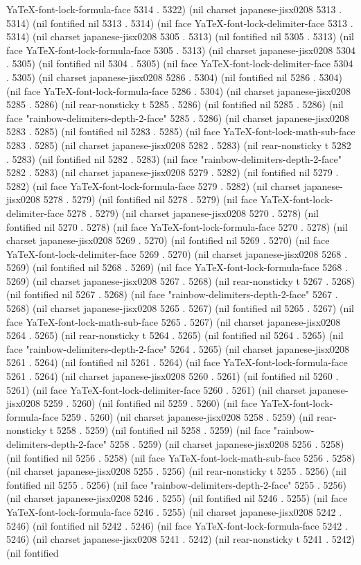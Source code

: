 YaTeX-font-lock-formula-face 5314 . 5322) (nil charset japanese-jisx0208 5313 . 5314) (nil fontified nil 5313 . 5314) (nil face YaTeX-font-lock-delimiter-face 5313 . 5314) (nil charset japanese-jisx0208 5305 . 5313) (nil fontified nil 5305 . 5313) (nil face YaTeX-font-lock-formula-face 5305 . 5313) (nil charset japanese-jisx0208 5304 . 5305) (nil fontified nil 5304 . 5305) (nil face YaTeX-font-lock-delimiter-face 5304 . 5305) (nil charset japanese-jisx0208 5286 . 5304) (nil fontified nil 5286 . 5304) (nil face YaTeX-font-lock-formula-face 5286 . 5304) (nil charset japanese-jisx0208 5285 . 5286) (nil rear-nonsticky t 5285 . 5286) (nil fontified nil 5285 . 5286) (nil face "rainbow-delimiters-depth-2-face" 5285 . 5286) (nil charset japanese-jisx0208 5283 . 5285) (nil fontified nil 5283 . 5285) (nil face YaTeX-font-lock-math-sub-face 5283 . 5285) (nil charset japanese-jisx0208 5282 . 5283) (nil rear-nonsticky t 5282 . 5283) (nil fontified nil 5282 . 5283) (nil face "rainbow-delimiters-depth-2-face" 5282 . 5283) (nil charset japanese-jisx0208 5279 . 5282) (nil fontified nil 5279 . 5282) (nil face YaTeX-font-lock-formula-face 5279 . 5282) (nil charset japanese-jisx0208 5278 . 5279) (nil fontified nil 5278 . 5279) (nil face YaTeX-font-lock-delimiter-face 5278 . 5279) (nil charset japanese-jisx0208 5270 . 5278) (nil fontified nil 5270 . 5278) (nil face YaTeX-font-lock-formula-face 5270 . 5278) (nil charset japanese-jisx0208 5269 . 5270) (nil fontified nil 5269 . 5270) (nil face YaTeX-font-lock-delimiter-face 5269 . 5270) (nil charset japanese-jisx0208 5268 . 5269) (nil fontified nil 5268 . 5269) (nil face YaTeX-font-lock-formula-face 5268 . 5269) (nil charset japanese-jisx0208 5267 . 5268) (nil rear-nonsticky t 5267 . 5268) (nil fontified nil 5267 . 5268) (nil face "rainbow-delimiters-depth-2-face" 5267 . 5268) (nil charset japanese-jisx0208 5265 . 5267) (nil fontified nil 5265 . 5267) (nil face YaTeX-font-lock-math-sub-face 5265 . 5267) (nil charset japanese-jisx0208 5264 . 5265) (nil rear-nonsticky t 5264 . 5265) (nil fontified nil 5264 . 5265) (nil face "rainbow-delimiters-depth-2-face" 5264 . 5265) (nil charset japanese-jisx0208 5261 . 5264) (nil fontified nil 5261 . 5264) (nil face YaTeX-font-lock-formula-face 5261 . 5264) (nil charset japanese-jisx0208 5260 . 5261) (nil fontified nil 5260 . 5261) (nil face YaTeX-font-lock-delimiter-face 5260 . 5261) (nil charset japanese-jisx0208 5259 . 5260) (nil fontified nil 5259 . 5260) (nil face YaTeX-font-lock-formula-face 5259 . 5260) (nil charset japanese-jisx0208 5258 . 5259) (nil rear-nonsticky t 5258 . 5259) (nil fontified nil 5258 . 5259) (nil face "rainbow-delimiters-depth-2-face" 5258 . 5259) (nil charset japanese-jisx0208 5256 . 5258) (nil fontified nil 5256 . 5258) (nil face YaTeX-font-lock-math-sub-face 5256 . 5258) (nil charset japanese-jisx0208 5255 . 5256) (nil rear-nonsticky t 5255 . 5256) (nil fontified nil 5255 . 5256) (nil face "rainbow-delimiters-depth-2-face" 5255 . 5256) (nil charset japanese-jisx0208 5246 . 5255) (nil fontified nil 5246 . 5255) (nil face YaTeX-font-lock-formula-face 5246 . 5255) (nil charset japanese-jisx0208 5242 . 5246) (nil fontified nil 5242 . 5246) (nil face YaTeX-font-lock-formula-face 5242 . 5246) (nil charset japanese-jisx0208 5241 . 5242) (nil rear-nonsticky t 5241 . 5242) (nil fontified 